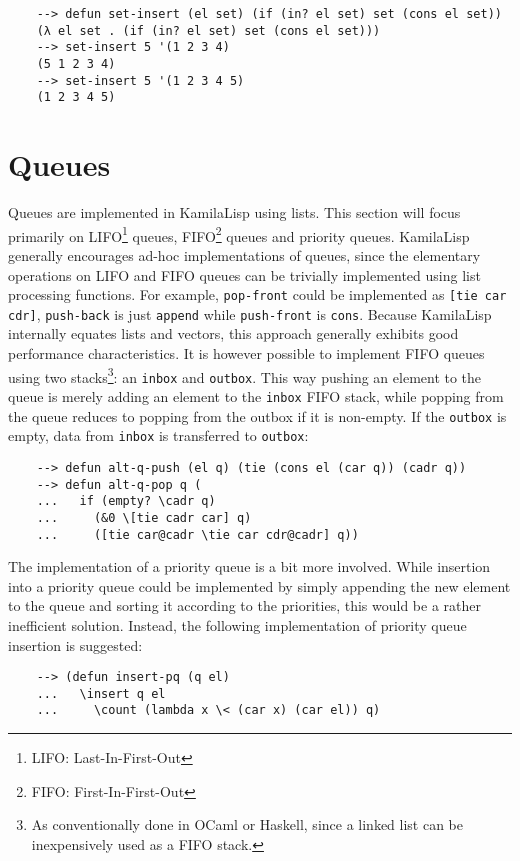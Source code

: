\begin{Verbatim}
    --> defun set-insert (el set) (if (in? el set) set (cons el set))
    (λ el set . (if (in? el set) set (cons el set)))
    --> set-insert 5 '(1 2 3 4)
    (5 1 2 3 4)
    --> set-insert 5 '(1 2 3 4 5)
    (1 2 3 4 5)
\end{Verbatim}

\section{Queues}

Queues are implemented in KamilaLisp using lists. This section will focus primarily on LIFO\footnote{LIFO: Last-In-First-Out} queues, FIFO\footnote{FIFO: First-In-First-Out} queues and priority queues. KamilaLisp generally encourages ad-hoc implementations of queues, since the elementary operations on LIFO and FIFO queues can be trivially implemented using list processing functions. For example, \verb|pop-front| could be implemented as \verb|[tie car cdr]|, \verb|push-back| is just \verb|append| while \verb|push-front| is \verb|cons|. Because KamilaLisp internally equates lists and vectors, this approach generally exhibits good performance characteristics. It is however possible to implement FIFO queues using two stacks\footnote{As conventionally done in OCaml or Haskell, since a linked list can be inexpensively used as a FIFO stack.}: an \verb|inbox| and \verb|outbox|. This way pushing an element to the queue is merely adding an element to the \verb|inbox| FIFO stack, while popping from the queue reduces to popping from the outbox if it is non-empty. If the \verb|outbox| is empty, data from \verb|inbox| is transferred to \verb|outbox|:

\begin{Verbatim}
    --> defun alt-q-push (el q) (tie (cons el (car q)) (cadr q))
    --> defun alt-q-pop q (
    ...   if (empty? \cadr q)
    ...     (&0 \[tie cadr car] q)
    ...     ([tie car@cadr \tie car cdr@cadr] q))
\end{Verbatim}

The implementation of a priority queue is a bit more involved. While insertion into a priority queue could be implemented by simply appending the new element to the queue and sorting it according to the priorities, this would be a rather inefficient solution. Instead, the following implementation of priority queue insertion is suggested:

\begin{Verbatim}
    --> (defun insert-pq (q el)
    ...   \insert q el
    ...     \count (lambda x \< (car x) (car el)) q)
\end{Verbatim}

